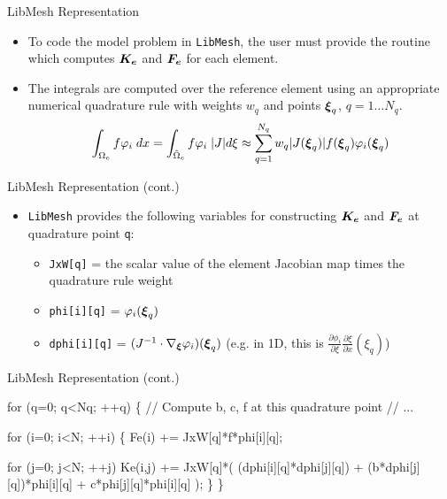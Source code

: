 \begin{frame}{LibMesh Representation}
\begin{itemize}
  \item To code the model problem in \texttt{LibMesh}, the user must provide the
    routine which computes ${\boldsymbol{K_e}}$ and ${\boldsymbol{F_e}}$ for each element.

  \item The integrals are computed over the reference element using an appropriate
    numerical quadrature rule with weights $w_q$ and points ${\boldsymbol{\xi}}_{q}$,  $q=1 \ldots N_{q}$.
    \begin{equation}
      \int_{\Omega_e} f \varphi_i \; dx =
      \int_{\hat{\Omega}_e} f \varphi_i \; |J| d\xi \approx
      \sum_{q=1}^{N_q} w_q |J({\boldsymbol{\xi}}_q)| f({\boldsymbol{\xi}}_q) \varphi_i({\boldsymbol{\xi}}_q)
      \end{equation}
\end{itemize}
\end{frame}


\begin{frame}{LibMesh Representation (cont.)}
\begin{itemize}
  \item \texttt{LibMesh} provides the following variables for constructing
    ${\boldsymbol{K_e}}$ and ${\boldsymbol{F_e}}$ at quadrature point \texttt{q}:
    \begin{itemize}
      \item \texttt{JxW[q]} = the scalar value of the element Jacobian map times the
	quadrature rule weight
      \item \texttt{phi[i][q]}  = $\varphi_i({\boldsymbol{\xi}}_{q})$
      \item \texttt{dphi[i][q]} = $(J^{-1} \cdot \nabla_{{\boldsymbol{\xi}}} \varphi_i) ({\boldsymbol{\xi}}_{q})$
	(e.g. in 1D, this is $\frac{\partial \phi_i}{\partial \xi}\frac{\partial \xi}{\partial x}(\xi_q)$)
    \end{itemize}
\end{itemize}
\end{frame}



\begin{frame}[fragile]{LibMesh Representation (cont.)}
\small
\begin{semiverbatim}
  for (q=0; q<Nq; ++q) \{
    // Compute b, c, f at this quadrature point
    // ...

    for (i=0; i<N; ++i) \{
      Fe(i)   += JxW[q]*f*phi[i][q];

      for (j=0; j<N; ++j)
        Ke(i,j) += JxW[q]*(
          (dphi[i][q]*dphi[j][q])  +
          (b*dphi[j][q])*phi[i][q] +
           c*phi[j][q]*phi[i][q]
                          );
    \}
  \}
\end{semiverbatim}

\end{frame}


